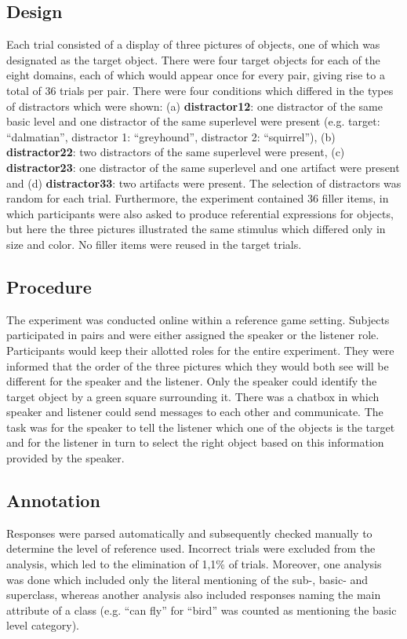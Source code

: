 \documentclass[10pt,letterpaper]{article}
\begin{document}
\subsection{\bf Design}
Each trial consisted of a display of three pictures of objects, one of which was designated as the target object. There were four target objects for each of the eight domains, each of which would appear once for every pair, giving rise to a total of 36 trials per pair. There were four conditions which differed in the types of distractors which were shown: (a) {\bf distractor12}: one distractor of the same basic level and one distractor of the same superlevel were present (e.g. target: “dalmatian”, distractor 1: “greyhound”, distractor 2: “squirrel”), (b) {\bf distractor22}: two distractors of the same superlevel were present, (c) {\bf distractor23}: one distractor of the same superlevel and one artifact were present and (d) {\bf distractor33}: two artifacts were present. The selection of distractors was random for each trial. Furthermore, the experiment contained 36 filler items, in which participants were also asked to produce referential expressions for objects, but here the three pictures illustrated the same stimulus which differed only in size and color. No filler items were reused in the target trials.

\subsection{\bf Procedure}
The experiment was conducted online within a reference game setting. Subjects participated in pairs and were either assigned the speaker or the listener role. Participants would keep their allotted roles for the entire experiment. They were informed that the order of the three pictures which they would both see will be different for the speaker and the listener. Only the speaker could identify the target object by a green square surrounding it. There was a chatbox in which speaker and listener could send messages to each other and communicate. The task was for the speaker to tell the listener which one of the objects is the target and for the listener in turn to select the right object based on this information provided by the speaker. 

\subsection{\bf Annotation}
Responses were parsed automatically and subsequently checked manually to determine the level of reference used. Incorrect trials were excluded from the analysis, which led to the elimination of 1,1\% of trials. Moreover, one analysis was done which included only the literal mentioning of the sub-, basic- and superclass, whereas another analysis also included responses naming the main attribute of a class (e.g. “can fly” for “bird” was counted as mentioning the basic level category). 
\end{document}
